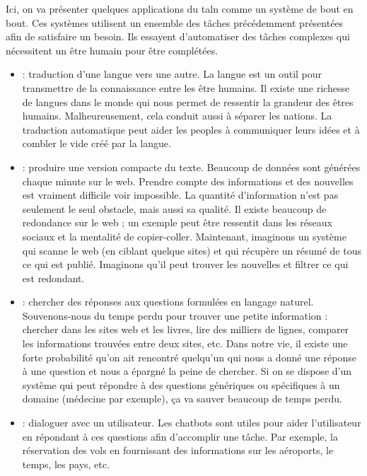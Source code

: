 \documentclass{KodeBook}
\begin{document}
Ici, on va présenter quelques applications du \ac{taln} comme un système de bout en bout. 
Ces systèmes utilisent un ensemble des tâches précédemment présentées afin de satisfaire un besoin. 
Ils essayent d'automatiser des tâches complexes qui nécessitent un être humain pour être complétées.
\begin{itemize}
	\item {} : traduction d'une langue vers une autre.
	La langue est un outil pour transmettre de la connaissance entre les être humains. 
	Il existe une richesse de langues dans le monde qui nous permet de ressentir la grandeur des êtres humains.
	Malheureusement, cela conduit aussi à séparer les nations.
	La traduction automatique peut aider les peoples à communiquer leurs idées et à combler le vide créé par la langue. 
	\item {} : produire une version compacte du texte.
	Beaucoup de données sont générées chaque minute sur le web. 
	Prendre compte des informations et des nouvelles est vraiment difficile voir impossible.
	La quantité d'information n'est pas seulement le seul obstacle, mais aussi sa qualité. 
	Il existe beaucoup de redondance sur le web ; un exemple peut être ressentit dans les réseaux sociaux et la mentalité de copier-coller. 
	Maintenant, imaginons un système qui scanne le web (en ciblant quelque sites) et qui récupère un résumé de tous ce qui est publié. 
	Imaginons qu'il peut trouver les nouvelles et filtrer ce qui est redondant.
	
	\item {} : chercher des réponses aux questions formulées en langage naturel.
	Souvenons-nous du temps perdu pour trouver une petite information : chercher dans les sites web et les livres, lire des milliers de lignes, comparer les informations trouvées entre deux sites, etc.
	Dans notre vie, il existe une forte probabilité qu'on ait rencontré quelqu'un qui nous a donné une réponse à une question et nous a épargné la peine de chercher.
	Si on se dispose d'un système qui peut répondre à des questions génériques ou spécifiques à un domaine (médecine par exemple), ça va sauver beaucoup de temps perdu.
	
	\item {} : dialoguer avec un utilisateur. 
	Les chatbots sont utiles pour aider l'utilisateur en répondant à ces questions afin d'accomplir une tâche.
	Par exemple, la réservation des vols en fournissant des informations sur les aéroports, le temps, les pays, etc. 
	

\end{itemize}
\end{document}
